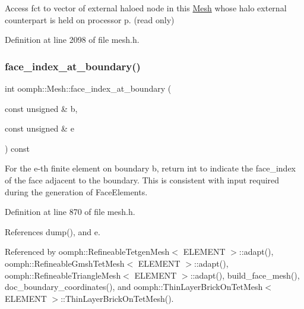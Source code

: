 Access fct to vector of external haloed node in this \hyperlink{classoomph_1_1Mesh}{Mesh} whose halo external counterpart is held on processor p. (read only) 



Definition at line 2098 of file mesh.\+h.

\mbox{\label{classoomph_1_1Mesh_a6095e417593de6136d248ab08823f453}} 
\subsubsection{\texorpdfstring{face\+\_\+index\+\_\+at\+\_\+boundary()}{face\_index\_at\_boundary()}}
{\footnotesize\ttfamily int oomph\+::\+Mesh\+::face\+\_\+index\+\_\+at\+\_\+boundary (\begin{DoxyParamCaption}\item[{const unsigned \&}]{b,  }\item[{const unsigned \&}]{e }\end{DoxyParamCaption}) const\hspace{0.3cm}{\ttfamily [inline]}}



For the e-\/th finite element on boundary b, return int to indicate the face\+\_\+index of the face adjacent to the boundary. This is consistent with input required during the generation of Face\+Elements. 



Definition at line 870 of file mesh.\+h.



References dump(), and e.



Referenced by oomph\+::\+Refineable\+Tetgen\+Mesh$<$ E\+L\+E\+M\+E\+N\+T $>$\+::adapt(), oomph\+::\+Refineable\+Gmsh\+Tet\+Mesh$<$ E\+L\+E\+M\+E\+N\+T $>$\+::adapt(), oomph\+::\+Refineable\+Triangle\+Mesh$<$ E\+L\+E\+M\+E\+N\+T $>$\+::adapt(), build\+\_\+face\+\_\+mesh(), doc\+\_\+boundary\+\_\+coordinates(), and oomph\+::\+Thin\+Layer\+Brick\+On\+Tet\+Mesh$<$ E\+L\+E\+M\+E\+N\+T $>$\+::\+Thin\+Layer\+Brick\+On\+Tet\+Mesh().

\mbox{\label{classoomph_1_1Mesh_a4f274774435e9454bf77bf70de69367a}} 
